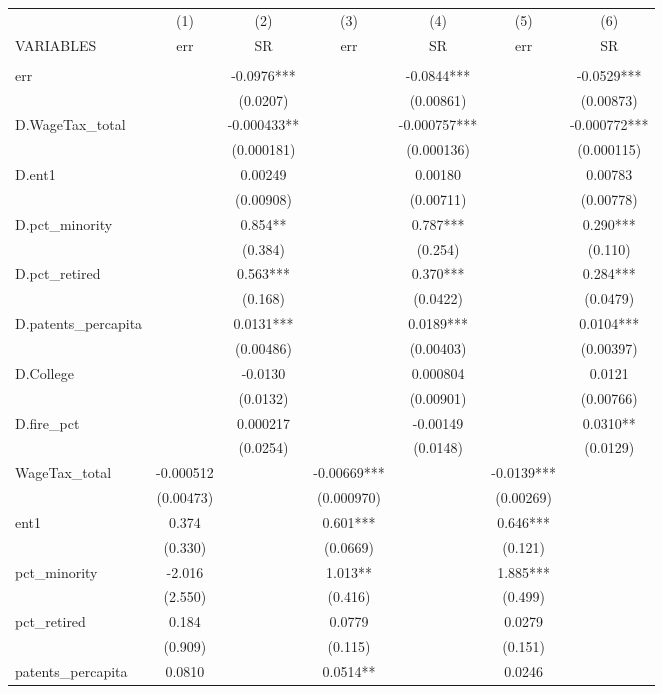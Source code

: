 \begin{tabular}{lcccccc} \hline
 & (1) & (2) & (3) & (4) & (5) & (6) \\
VARIABLES & err & SR & err & SR & err & SR \\ \hline
 &  &  &  &  &  &  \\
err &  & -0.0976*** &  & -0.0844*** &  & -0.0529*** \\
 &  & (0.0207) &  & (0.00861) &  & (0.00873) \\
D.WageTax\_total &  & -0.000433** &  & -0.000757*** &  & -0.000772*** \\
 &  & (0.000181) &  & (0.000136) &  & (0.000115) \\
D.ent1 &  & 0.00249 &  & 0.00180 &  & 0.00783 \\
 &  & (0.00908) &  & (0.00711) &  & (0.00778) \\
D.pct\_minority &  & 0.854** &  & 0.787*** &  & 0.290*** \\
 &  & (0.384) &  & (0.254) &  & (0.110) \\
D.pct\_retired &  & 0.563*** &  & 0.370*** &  & 0.284*** \\
 &  & (0.168) &  & (0.0422) &  & (0.0479) \\
D.patents\_percapita &  & 0.0131*** &  & 0.0189*** &  & 0.0104*** \\
 &  & (0.00486) &  & (0.00403) &  & (0.00397) \\
D.College &  & -0.0130 &  & 0.000804 &  & 0.0121 \\
 &  & (0.0132) &  & (0.00901) &  & (0.00766) \\
D.fire\_pct &  & 0.000217 &  & -0.00149 &  & 0.0310** \\
 &  & (0.0254) &  & (0.0148) &  & (0.0129) \\
WageTax\_total & -0.000512 &  & -0.00669*** &  & -0.0139*** &  \\
 & (0.00473) &  & (0.000970) &  & (0.00269) &  \\
ent1 & 0.374 &  & 0.601*** &  & 0.646*** &  \\
 & (0.330) &  & (0.0669) &  & (0.121) &  \\
pct\_minority & -2.016 &  & 1.013** &  & 1.885*** &  \\
 & (2.550) &  & (0.416) &  & (0.499) &  \\
pct\_retired & 0.184 &  & 0.0779 &  & 0.0279 &  \\
 & (0.909) &  & (0.115) &  & (0.151) &  \\
patents\_percapita & 0.0810 &  & 0.0514** &  & 0.0246 &  \\

\end{tabular}
